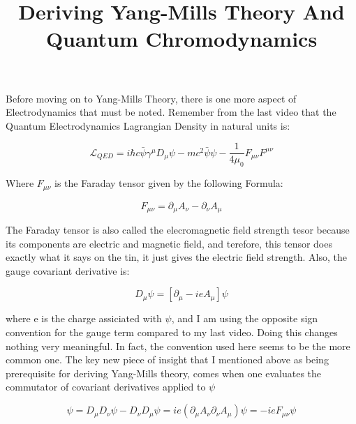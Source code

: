 \documentclass[a4]{article}
\begin{document}
    \title{Deriving Yang-Mills Theory And Quantum Chromodynamics}
    \maketitle

    Before moving on to Yang-Mills Theory, there is one more aspect of Electrodynamics that must be noted.
    Remember from the last video that the Quantum Electrodynamics Lagrangian Density in natural units is:

    \begin{equation}
        \mathcal{L}_{QED} = i \hbar c \bar{\psi} \gamma^{\mu} D_{\mu} \psi - m c^{2} \bar{\psi} \psi - \frac{1}{4 \mu_{0}} F_{\mu \nu} F^{\mu \nu}
    \end{equation}

    Where $F_{\mu \nu}$ is the Faraday tensor given by the following Formula:

    \begin{equation}
        F_{\mu \nu} = \partial_{\mu} A_{\nu} - \partial_{\nu} A_{\mu}
    \end{equation}

    The Faraday tensor is also called the elecromagnetic field strength tesor because its components are
    electric and magnetic field, and terefore, this tensor does exactly what it says on the tin, it just 
    gives the electric field strength. Also, the gauge covariant derivative is:

    \begin{equation}
        D_{\mu} \psi = [\partial_{\mu} - i e A_{\mu}] \psi
    \end{equation}

    where e is the charge assiciated with $\psi$, and I am using the opposite sign convention for the gauge
    term compared to my last video. Doing this changes nothing very meaningful. In fact, the convention used
    here seems to be the more common one. The key new piece of insight that I mentioned above as being
    prerequisite for deriving Yang-Mills theory, comes when one evaluates the commutator of covariant derivatives
    applied to $\psi$

    \begin{equation}
        [D_{\mu}, D_{\nu}] \psi = D_{\mu} D_{\nu} \psi - D_{\nu} D_{\mu} \psi = i e (\partial_{\mu} A_{\nu} \partial_{\nu} A_{\mu}) \psi = - i e F_{\mu \nu} \psi
    \end{equation}
\end{document}
